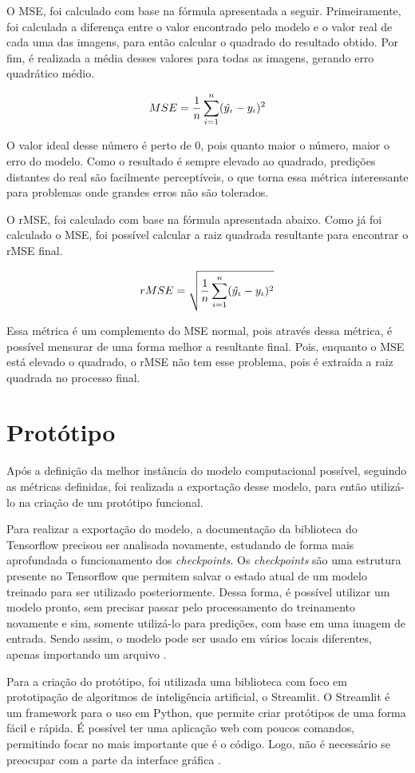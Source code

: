 O MSE, foi calculado com base na fórmula apresentada a seguir. Primeiramente, foi calculada a diferença entre o valor encontrado pelo modelo e o valor real de cada uma das imagens, para então calcular o quadrado do resultado obtido. Por fim, é realizada a média desses valores para todas as imagens, gerando erro quadrático médio.

\[ MSE = \frac{1}{n}\sum_{i=1}^{n} (\skew{4.5}\hat{y}_\iota - y_\iota)^{2} \]

O valor ideal desse número é perto de 0, pois quanto maior o número, maior o erro do modelo. Como o resultado é sempre elevado ao quadrado, predições distantes do real são facilmente perceptíveis, o que torna essa métrica interessante para problemas onde grandes erros não são tolerados.

O rMSE, foi calculado com base na fórmula apresentada abaixo. Como já foi calculado o MSE, foi possível calcular a raiz quadrada resultante para encontrar o rMSE final.

\[ rMSE = \sqrt{\frac{1}{n}\sum_{i=1}^{n} (\skew{4.5}\hat{y}_\iota - y_\iota)^{2}} \]

Essa métrica é um complemento do MSE normal, pois através dessa métrica, é possível mensurar de uma forma melhor a resultante final. Pois, enquanto o MSE está elevado o quadrado, o rMSE não tem esse problema, pois é extraída a raiz quadrada no processo final.

\section{Protótipo}
Após a definição da melhor instância do modelo computacional possível, seguindo as métricas definidas, foi realizada a exportação desse modelo, para então utilizá-lo na criação de um protótipo funcional.

Para realizar a exportação do modelo, a documentação da biblioteca do Tensorflow precisou ser analisada novamente, estudando de forma mais aprofundada o funcionamento dos \emph{checkpoints}. Os \emph{checkpoints} são uma estrutura presente no Tensorflow que permitem salvar o estado atual de um modelo treinado para ser utilizado posteriormente. Dessa forma, é possível utilizar um modelo pronto, sem precisar passar pelo processamento do treinamento novamente e sim, somente utilizá-lo para predições, com base em uma imagem de entrada. Sendo assim, o modelo pode ser usado em vários locais diferentes, apenas importando um arquivo \cite{websiteTensorFlow}.

Para a criação do protótipo, foi utilizada uma biblioteca com foco em prototipação de algoritmos de inteligência artificial, o Streamlit. O Streamlit é um framework para o uso em Python, que permite criar protótipos de uma forma fácil e rápida. É possível ter uma aplicação web com poucos comandos, permitindo focar no mais importante que é o código. Logo, não é necessário se preocupar com a parte da interface gráfica \cite{websiteStreamlit}.

